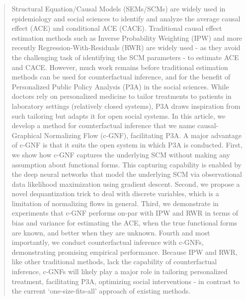 \documentclass[letterpaper]{article} %
\begin{document}
\begin{abstract}



Structural Equation/Causal Models (SEMs/SCMs) are widely used in epidemiology and social sciences to identify and analyze the average causal effect (ACE) and conditional ACE (CACE). Traditional causal effect estimation methods such as Inverse Probability Weighting (IPW) and more recently Regression-With-Residuals (RWR) are widely used - as they avoid the challenging task of identifying the SCM parameters - to estimate ACE and CACE. However, much work remains before traditional estimation methods can be used for counterfactual inference, and for the benefit of Personalized Public Policy Analysis (P3A) in the social sciences. While doctors rely on personalized medicine to tailor treatments to patients in laboratory settings (relatively closed systems), P3A draws inspiration from such tailoring but adapts it for open social systems. In this article, we develop a method for counterfactual inference that we name causal-Graphical Normalizing Flow (c-GNF), facilitating P3A. A major advantage of c-GNF is that it suits the open system in which P3A is conducted. First, we show how c-GNF captures the underlying SCM without making any assumption about functional forms. This capturing capability is enabled by the deep neural networks that model the underlying SCM via observational data likelihood maximization using gradient descent. Second, we propose a novel dequantization trick to deal with discrete variables, which is a limitation of normalizing flows in general. Third, we demonstrate in experiments that c-GNF performs on-par with IPW and RWR in terms of bias and variance for estimating the ACE, when the true functional forms are known, and better when they are unknown. Fourth and most importantly, we conduct counterfactual inference with c-GNFs, demonstrating promising empirical performance. Because IPW and RWR, like other traditional methods, lack the capability of counterfactual inference, c-GNFs will likely play a major role in tailoring personalized  treatment, facilitating P3A, optimizing social interventions - in contrast to the current `one-size-fits-all' approach of existing methods.
\end{abstract}
\end{document}
